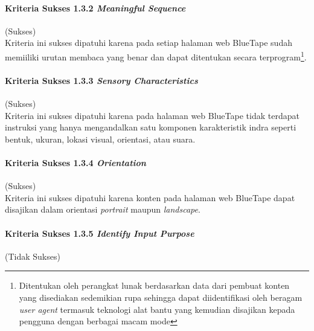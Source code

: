 \paragraph{Kriteria Sukses 1.3.2 \textit{Meaningful Sequence}}
\label{par:kepatuhan_bluetape_kriteria_sukses_1.3.2}
(Sukses)\\

Kriteria ini sukses dipatuhi karena pada setiap halaman web BlueTape sudah memiiliki urutan membaca yang benar dan dapat ditentukan secara terprogram\footnote{Ditentukan oleh perangkat lunak berdasarkan data dari pembuat konten yang disediakan sedemikian rupa sehingga dapat diidentifikasi oleh beragam \textit{user agent} termasuk teknologi alat bantu yang kemudian disajikan kepada pengguna dengan berbagai macam mode}. 

\paragraph{Kriteria Sukses 1.3.3 \textit{Sensory Characteristics}}
\label{par:kepatuhan_bluetape_kriteria_sukses_1.3.3}
(Sukses)\\

Kriteria ini sukses dipatuhi karena pada halaman web BlueTape tidak terdapat instruksi yang hanya mengandalkan satu komponen karakteristik indra seperti bentuk, ukuran, lokasi visual, orientasi,
atau suara.

\paragraph{Kriteria Sukses 1.3.4 \textit{Orientation}}
\label{par:kepatuhan_bluetape_kriteria_sukses_1.3.4}
(Sukses)\\

Kriteria ini sukses dipatuhi karena konten pada halaman web BlueTape dapat disajikan dalam orientasi \textit{portrait} maupun \textit{landscape}.

\paragraph{Kriteria Sukses 1.3.5 \textit{Identify Input Purpose}}
\label{par:kepatuhan_bluetape_kriteria_sukses_1.3.5}
(Tidak Sukses)\\

